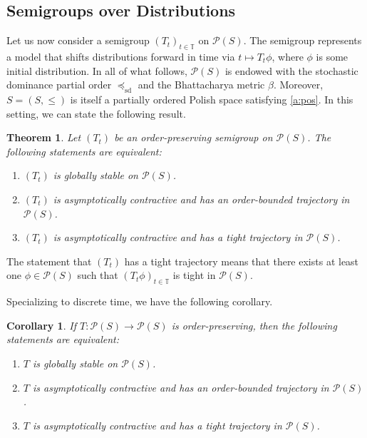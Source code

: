 \documentclass[12pt,reqno]{amsart}
\numberwithin{equation}{section}
\newtheorem{theorem}{Theorem}[section]
\newtheorem{corollary}{Corollary}[section]
\theoremstyle{definition}
\newcommand{\1}{\mathbbm{1}}
\newcommand{\TT}{\mathbb T}
\newcommand{\pP}{\mathscr{P}}
\newcommand{\precsd}{\preceq_{\textrm{sd}}}
\begin{document}
\subsection{Semigroups over Distributions}

Let us now consider a semigroup $(T_t)_{t \in \TT}$ on $\pP(S)$.
The semigroup represents a model that shifts distributions forward in time via
$t \mapsto T_t \phi$, where $\phi$ is some initial distribution.
In all of what follows,
$\pP(S)$ is endowed with the stochastic dominance partial order $\precsd$ and
the Bhattacharya metric $\beta$. Moreover, $S = (S, \leq)$ is itself a partially
ordered Polish space satisfying \cref{a:pos}. In this setting, we can state the
following result.

\begin{theorem}\label{t:act}
    Let $(T_t)$ be an order-preserving semigroup on $\pP(S)$. The following statements are equivalent:
    \begin{enumerate}
        \item $(T_t)$ is globally stable on $\pP(S)$.
        \item $(T_t)$ is asymptotically contractive and has an order-bounded trajectory in $\pP(S)$.
        \item $(T_t)$ is asymptotically contractive and has a tight trajectory in $\pP(S)$.
    \end{enumerate}
\end{theorem}

The statement that $(T_t)$ has a tight trajectory means that there exists at least
one $\phi \in \pP(S)$ such that $(T_t \phi)_{t \in \TT}$ is tight in $\pP(S)$.

Specializing to discrete time, we have the following corollary.

\begin{corollary}\label{c:act}
    If $T \colon \pP(S) \to \pP(S)$ is order-preserving, then the following statements are equivalent:
    \begin{enumerate}
        \item $T$ is globally stable on $\pP(S)$.
        \item $T$ is asymptotically contractive and has an order-bounded trajectory in $\pP(S)$.
        \item $T$ is asymptotically contractive and has a tight trajectory in $\pP(S)$.
    \end{enumerate}
\end{corollary}
\end{document}
